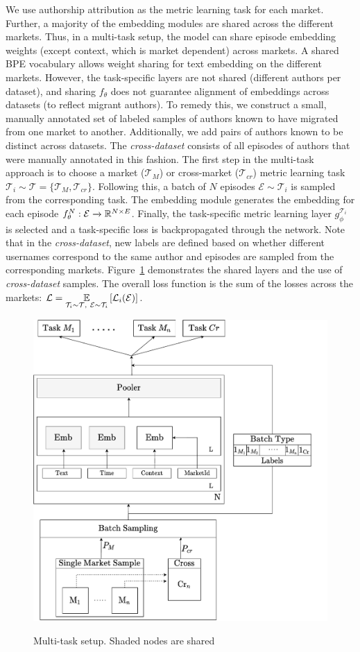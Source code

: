 We use authorship attribution as the metric learning task for each market.
Further, a majority of the embedding modules are shared across the different markets.
Thus, in a multi-task setup, the model can share episode embedding weights (except context, which is market dependent) across markets. 
A shared BPE vocabulary allows weight sharing for text embedding on the different markets. 
However, the task-specific layers are not shared (different authors per dataset), and sharing $f_\theta$ does not guarantee alignment of embeddings across datasets (to reflect migrant authors). 
To remedy this, we construct a small, manually annotated set of labeled samples of authors known to have migrated from one market to another.
Additionally, we add pairs of authors known to be distinct across datasets.
The \textit{cross-dataset} consists of all episodes of authors that were manually annotated in this fashion.
The first step in the multi-task approach is to choose a market {($\mathcal{T}_M$)} or cross-market {($\mathcal{T}_{cr}$)} metric learning task $\mathcal{T}_i \sim \mathcal{T} =  \{\mathcal{T}_M, \mathcal{T}_{cr} \}$.
Following this, a batch of $N$ episodes $\mathcal{E} \sim \mathcal{T}_i$ is sampled from the corresponding task.
The embedding module generates the embedding for each episode $f_{\theta}^N: \mathcal{E} \xrightarrow[]{} \mathbb{R}^{N \times E}$. 
Finally, the task-specific metric learning layer $g_{\phi}^{\mathcal{T}_i}$ is selected and a task-specific loss is backpropagated through the network. 
Note that in the \textit{cross-dataset}, new labels are defined based on whether different usernames correspond to the same author and episodes are sampled from the corresponding markets. 
Figure~\ref{fig:multitask_setup} demonstrates the shared layers and the use of \textit{cross-dataset} samples. 
The overall loss function is the sum of the losses across the markets: $\mathcal{L} = \underset{\mathcal{T}_i \sim \mathcal{T},\ \mathcal{E} \sim \mathcal{T}_i}{\mathbb{E}}\left[\mathcal{L}_i(\mathcal{E})\right] $.
\begin{figure}
    \centering
    \includegraphics[width=0.8\linewidth,alt={Block diagram for the multitask setup.}]{sysml/figures/MultiTask.pdf}
    \caption{Multi-task setup. Shaded nodes are shared}
    \label{fig:multitask_setup}
\end{figure}
